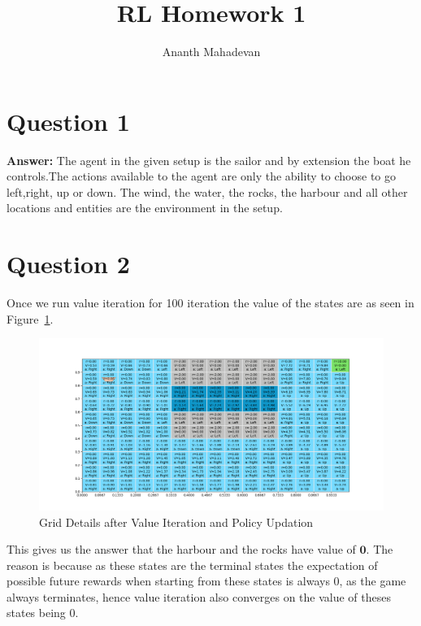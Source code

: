 \documentclass[a4paper]{article}
\title{RL Homework 1}
\author{Ananth Mahadevan}
\begin{document}
\maketitle
\clearpage
\tableofcontents
\clearpage

\section{Question 1}
\textbf{Answer:} The agent in the given setup is the sailor and by extension the boat he controls.The actions available  to the agent are only the ability to choose to go left,right, up or down. The wind, the water, the rocks, the harbour and all other locations and entities are the environment in the setup. 
\section{Question 2}
Once we run value iteration for 100 iteration the value of the states are as seen in Figure~\ref{fig-sailor}.
\begin{figure}[ht!]
    \centering
    \includegraphics[width=\textwidth]{Sailor.png}
    \caption{Grid Details after Value Iteration and Policy Updation}
    \label{fig-sailor}
\end{figure}
This gives us the answer that the harbour and the rocks have value of $\mathbf{0}$. The reason is because as these states are the terminal states the expectation of possible future rewards when starting from these states is always 0, as the game always terminates, hence value iteration also converges on the value of theses states being 0.
\end{document}
